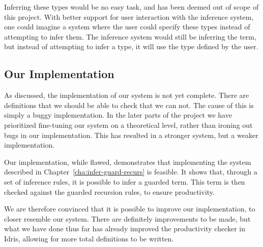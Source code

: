 Inferring these types would be no easy task, and has been deemed out of scope of
this project. With better support for user interaction with the
inference system, one could imagine a system where the user could specify these
types instead of attempting to infer them. The inference system would still be
inferring the term, but instead of attempting to infer a type, it will use the
type defined by the user.




\subsection{Our Implementation}
\label{sec:our-implementation}
As discussed, the implementation of our system is not yet complete. There are
definitions that we should be able to check that we can not. The cause of this is
simply a buggy implementation. In the later parts of the project we have
prioritized fine-tuning our system on a theoretical level, rather than ironing
out bugs in our implementation. This has resulted in a stronger system, but a
weaker implementation.

Our implementation, while flawed, demonstrates that implementing
the system described in Chapter~\ref{cha:infer-guard-recurs} is feasible. It
shows that, through a set of inference rules, it is possible to infer a guarded
term. This term is then checked against the guarded recursion rules, to ensure
productivity.

We are therefore convinced that it is possible to improve our implementation, to closer
resemble our system. There are definitely improvements to be made, but what we
have done thus far has already improved the productivity checker in Idris,
allowing for more total definitions to be written.
